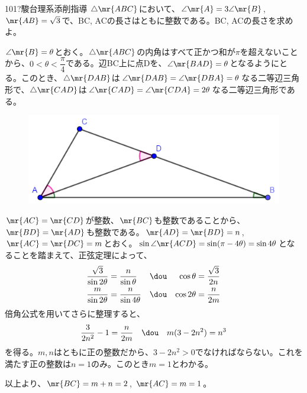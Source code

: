 \begin{thm}{101}{\hosi ?}{駿台理系添削指導}
 $\triangle\mr{ABC}$において、$\angle\mr{A}=3\angle\mr{B}$, $\mr{AB}=\sqrt{3}$で、BC, ACの長さはともに整数である。BC, ACの長さを求めよ。
\end{thm}

$\angle\mr{B}=\theta$とおく。$\triangle\mr{ABC}$の内角はすべて正かつ和が$\pi$を超えないことから、$0<\theta<\dfrac{\pi}{4}$である。辺BC上に点Dを、$\angle\mr{BAD}=\theta$となるようにとる。このとき、$\triangle\mr{DAB}$は$\angle\mr{DAB}=\angle\mr{DBA}=\theta$なる二等辺三角形で、$\triangle\mr{CAD}$は$\angle\mr{CAD}=\angle\mr{CDA}=2\theta$なる二等辺三角形である。
\begin{figure}[H]
 \centering
 \includegraphics[width=0.7\linewidth]{../problems/Q_101/A_101.png}
\end{figure}
$\mr{AC}=\mr{CD}$が整数、$\mr{BC}$も整数であることから、$\mr{BD}=\mr{AD}$も整数である。$\mr{AD}=\mr{BD}=n$, $\mr{AC}=\mr{DC}=m$とおく。$\sin\angle\mr{ACD}=\sin(\pi-4\theta)=\sin4\theta$となることを踏まえて、正弦定理によって、
\begin{align*}
 \frac{\sqrt{3}}{\sin2\theta}&=\frac{n}{\sin\theta} & &\dou & \cos\theta&=\frac{\sqrt{3}}{2n} \\
 \frac{m}{\sin2\theta}&=\frac{n}{\sin4\theta} & &\dou & \cos2\theta&=\frac{n}{2m}
\end{align*}
倍角公式を用いてさらに整理すると、
\[ \frac{3}{2n^2}-1=\frac{n}{2m} \quad\dou\quad m(3-2n^2)=n^3 \]
を得る。$m, n$はともに正の整数だから、$3-2n^2>0$でなければならない。これを満たす正の整数は$n=1$のみ。このとき$m=1$とわかる。

以上より、$\mr{BC}=m+n=2$, $\mr{AC}=m=1$。